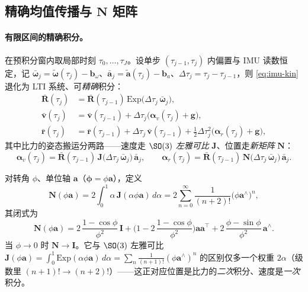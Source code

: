 \subsection{精确均值传播与 \texorpdfstring{$\mathbf{N}$}{N} 矩阵}
\label{subsec:preint-mean}

\paragraph{有限区间的精确积分。}
在预积分窗内取局部时刻 $\tau_0,\dots,\tau_J$。设单步 $(\tau_{j-1},\tau_j)$ 内偏置与 IMU 读数恒定，记 $\bar{\boldsymbol{\omega}}_j=\tilde{\boldsymbol{\omega}}(\tau_j)-\mathbf{b}_\omega$、$\bar{\mathbf{a}}_j=\tilde{\mathbf{a}}(\tau_j)-\mathbf{b}_a$、$\Delta\tau_j=\tau_j-\tau_{j-1}$，则 \cref{eq:imu-kin} 退化为 LTI 系统、可\emph{精确}积分\cite{barfoot2024state}：
\begin{align}
  \bar{\mathbf{R}}(\tau_j)&=\bar{\mathbf{R}}(\tau_{j-1})\,\mathrm{Exp}\!\big(\Delta\tau_j\,\bar{\boldsymbol{\omega}}_j\big),\label{eq:preint-Rprop}\\
  \bar{\mathbf{v}}(\tau_j)&=\bar{\mathbf{v}}(\tau_{j-1})+\Delta\tau_j\big(\boldsymbol{\alpha}_v(\tau_j)+\mathbf{g}\big),\nonumber\\
  \bar{\mathbf{r}}(\tau_j)&=\bar{\mathbf{r}}(\tau_{j-1})+\Delta\tau_j\,\bar{\mathbf{v}}(\tau_{j-1})+\tfrac12\Delta\tau_j^2\big(\boldsymbol{\alpha}_r(\tau_j)+\mathbf{g}\big),\nonumber
\end{align}
其中比力的姿态搬运分两路——速度走 $\SO(3)$ \emph{左雅可比} $\mathbf{J}$、位置走\emph{新矩阵} $\mathbf{N}$：
\begin{equation}
  \boldsymbol{\alpha}_v(\tau_j)=\bar{\mathbf{R}}(\tau_{j-1})\,\mathbf{J}\!\big(\Delta\tau_j\,\bar{\boldsymbol{\omega}}_j\big)\,\bar{\mathbf{a}}_j,\qquad
  \boldsymbol{\alpha}_r(\tau_j)=\bar{\mathbf{R}}(\tau_{j-1})\,\mathbf{N}\!\big(\Delta\tau_j\,\bar{\boldsymbol{\omega}}_j\big)\,\bar{\mathbf{a}}_j.
  \label{eq:preint-alpha}
\end{equation}

\begin{definition}\label{def:N-matrix}
对转角 $\phi$、单位轴 $\mathbf{a}$（$\boldsymbol{\phi}=\phi\mathbf{a}$），定义
\begin{equation}
  \mathbf{N}(\phi\mathbf{a})=2\!\int_0^1\!\alpha\,\mathbf{J}(\alpha\phi\mathbf{a})\,d\alpha
  =2\sum_{n=0}^\infty\frac{1}{(n+2)!}\big(\phi\mathbf{a}^\wedge\big)^n,
  \label{eq:N-series}
\end{equation}
其闭式为
\begin{equation}
  \mathbf{N}(\phi\mathbf{a})=2\,\frac{1-\cos\phi}{\phi^2}\,\mathbf{I}
  +\Big(1-2\,\frac{1-\cos\phi}{\phi^2}\Big)\mathbf{a}\mathbf{a}^\top
  +2\,\frac{\phi-\sin\phi}{\phi^2}\,\mathbf{a}^\wedge.
  \label{eq:N-closed}
\end{equation}
当 $\phi\to0$ 时 $\mathbf{N}\to\mathbf{I}$。它与 $\SO(3)$ 左雅可比 $\mathbf{J}(\phi\mathbf{a})=\int_0^1\mathrm{Exp}(\alpha\phi\mathbf{a})\,d\alpha=\sum_n\frac{1}{(n+1)!}(\phi\mathbf{a}^\wedge)^n$ 的区别仅多一个权重 $2\alpha$（级数里 $(n+1)!\to(n+2)!$）——这正对应位置是比力的\emph{二次}积分、速度是\emph{一次}积分。
\end{definition}

